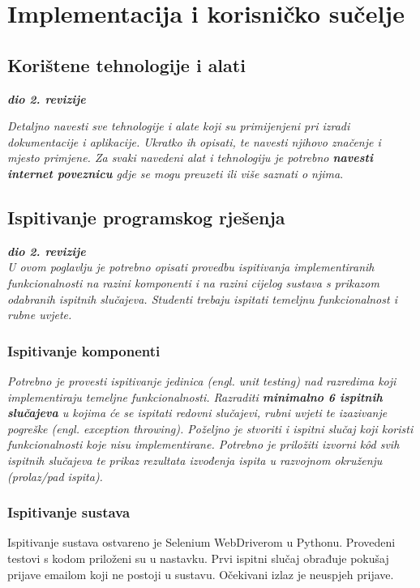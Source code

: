 \chapter{Implementacija i korisničko sučelje}
		
		
		\section{Korištene tehnologije i alati}
		
			\textbf{\textit{dio 2. revizije}}
			
			 \textit{Detaljno navesti sve tehnologije i alate koji su primijenjeni pri izradi dokumentacije i aplikacije. Ukratko ih opisati, te navesti njihovo značenje i mjesto primjene. Za svaki navedeni alat i tehnologiju je potrebno \textbf{navesti internet poveznicu} gdje se mogu preuzeti ili više saznati o njima}.
			
			
			\eject 
		
	
		\section{Ispitivanje programskog rješenja}
			
			\textbf{\textit{dio 2. revizije}}\\
			
			 \textit{U ovom poglavlju je potrebno opisati provedbu ispitivanja implementiranih funkcionalnosti na razini komponenti i na razini cijelog sustava s prikazom odabranih ispitnih slučajeva. Studenti trebaju ispitati temeljnu funkcionalnost i rubne uvjete.}
	
			
			\subsection{Ispitivanje komponenti}
			\textit{Potrebno je provesti ispitivanje jedinica (engl. unit testing) nad razredima koji implementiraju temeljne funkcionalnosti. Razraditi \textbf{minimalno 6 ispitnih slučajeva} u kojima će se ispitati redovni slučajevi, rubni uvjeti te izazivanje pogreške (engl. exception throwing). Poželjno je stvoriti i ispitni slučaj koji koristi funkcionalnosti koje nisu implementirane. Potrebno je priložiti izvorni kôd svih ispitnih slučajeva te prikaz rezultata izvođenja ispita u razvojnom okruženju (prolaz/pad ispita). }
			
			 

			\subsection{Ispitivanje sustava}
Ispitivanje sustava ostvareno je Selenium WebDriverom u Pythonu. Provedeni testovi s kodom priloženi su u nastavku.
\break
Prvi ispitni slučaj obrađuje pokušaj prijave emailom koji ne postoji u sustavu. Očekivani izlaz je neuspjeh prijave.

